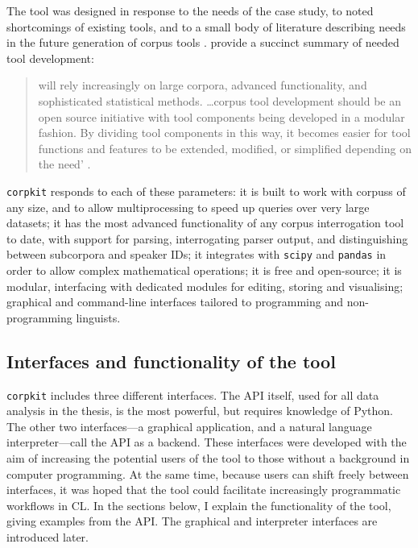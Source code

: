 The tool was designed in response to the needs of the case study, to noted shortcomings of existing tools, and to a small body of literature describing needs in the future generation of \gls{corpus} tools \cite[e.g.][]{anthony_critical_2013,anthony_developing_2006,gries_50-something_2013}. \textcite{anthony_critical_2013} provide a succinct summary of needed tool development:

\begin{quote} \small {} will rely increasingly on large corpora, advanced functionality, and sophisticated statistical methods. \ldots \Gls{corpus} tool development should be an open source initiative with tool components being developed in a modular fashion. By dividing tool components in this way, it becomes easier for tool functions and features to be extended, modified, or simplified depending on the need' \parencite*[pp.~155--156]{anthony_critical_2013}.
\end{quote}
%
\texttt{corpkit} responds to each of these parameters: it is built to work with \glspl{corpus} of any size, and to allow multiprocessing to speed up queries over very large datasets; it has the most advanced functionality of any corpus interrogation tool to date, with support for parsing, interrogating parser output, and distinguishing between subcorpora and speaker IDs; it integrates with \texttt{scipy} \cite{scipy2001} and \texttt{pandas} \cite{mckinney_pandas_2010} in order to allow complex mathematical operations; it is free and open\hyp{}source; it is modular, interfacing with dedicated modules for editing, storing and visualising; graphical and command\hyp{}line interfaces tailored to programming and non\hyp{}programming linguists.

\subsection{Interfaces and functionality of the tool}

\texttt{corpkit} includes three different interfaces. The \gls{API} itself, used for all data analysis in the thesis, is the most powerful, but requires knowledge of Python. The other two interfaces---a graphical application, and a natural language interpreter---call the \gls{API} as a backend. These interfaces were developed with the aim of increasing the potential users of the tool to those without a background in computer programming. At the same time, because users can shift freely between interfaces, it was hoped that the tool could facilitate increasingly programmatic workflows in \gls{CL}. In the sections below, I explain the functionality of the tool, giving examples from the \gls{API}. The graphical and interpreter interfaces are introduced later.

